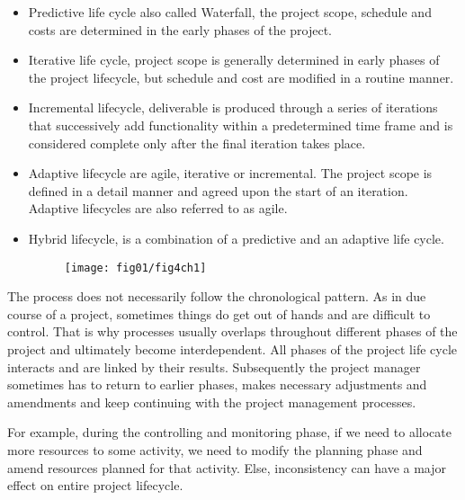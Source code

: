 \begin{itemize}
    \item Predictive life cycle also called Waterfall, the project scope, schedule and costs are determined in the early phases of the project.

    \item Iterative life cycle, project scope is generally determined in early phases of the project lifecycle, but schedule and cost are modified in a routine manner.

    \item Incremental lifecycle, deliverable is produced through a series of iterations that successively add functionality within a predetermined time frame and is considered complete only after the final iteration takes place.

    \item Adaptive lifecycle are agile, iterative or incremental. The project scope is defined in a detail manner and agreed upon the start of an iteration. Adaptive lifecycles are also referred to as agile.
    \item Hybrid lifecycle, is a combination of a predictive and an adaptive life cycle. 
    
    \begin{figure}
    	\centering
    	\texttt{[image: fig01/fig4ch1]}
    \end{figure}
  
\end{itemize}

The process does not necessarily follow the chronological pattern. As in due course of a project, sometimes things do get out of hands and are difficult to control. That is why processes usually overlaps throughout different phases of the project and ultimately become interdependent. All phases of the project life cycle interacts and are linked by their results. Subsequently the project manager sometimes has to return to earlier phases, makes necessary adjustments and amendments and keep continuing with the project management processes. 

 
For example, during the controlling and monitoring phase, if we need to allocate more resources to some activity, we need to modify the planning phase and amend resources planned for that activity. Else, inconsistency can have a major effect on entire project lifecycle.

